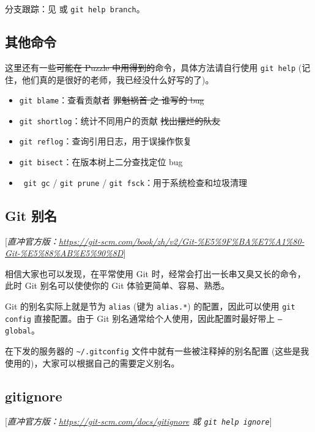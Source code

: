 \documentclass{article}
\def\danger{{\manual\char127}}
\begin{document}
	分支跟踪：见 \cite{sast2021-git-2} 或 \texttt{git help branch}。

	\subsection{其他命令}

	这里还有一些\sout{可能在 Puzzle 中用得到的}命令，具体方法请自行使用 \texttt{git help} (记住，他们真的是很好的老师，我已经没什么好写的了)。

	\begin{itemize}
		\itemsep0pt
		\item \texttt{git blame}：查看贡献者 \sout{罪魁祸首 之 谁写的 bug}
		\item \texttt{git shortlog}：统计不同用户的贡献 \sout{找出摆烂的队友}
		\item \texttt{git reflog}：查询引用日志，用于误操作恢复
		\item \texttt{git bisect}：在版本树上二分查找定位 bug
		\item \danger\ \texttt{git gc} / \texttt{git prune} / \texttt{git fsck}：用于系统检查和垃圾清理
	\end{itemize}

	\subsection{Git 别名}
	\label{sss:gitalias}

	\textcolor{properpurple}{[\textit{直冲官方版：\url{https://git-scm.com/book/zh/v2/Git-\%E5\%9F\%BA\%E7\%A1\%80-Git-\%E5\%88\%AB\%E5\%90\%8D}}]}

	相信大家也可以发现，在平常使用 Git 时，经常会打出一长串又臭又长的命令，此时 Git 别名可以使使你的 Git 体验更简单、容易、熟悉。

	Git 的别名实际上就是节为 \texttt{alias} (键为 \texttt{alias.*}) 的配置，因此可以使用 \texttt{git config} 直接配置。由于 Git 别名通常给个人使用，因此配置时最好带上 \texttt{--global}。

	在下发的服务器的 \verb!~/.gitconfig! 文件中就有一些被注释掉的别名配置 (这些是我使用的)，大家可以根据自己的需要定义别名。

	\subsection{gitignore}

	\textcolor{properpurple}{[\textit{直冲官方版：\url{https://git-scm.com/docs/gitignore} 或 \texttt{git help ignore}}]}
\end{document}
